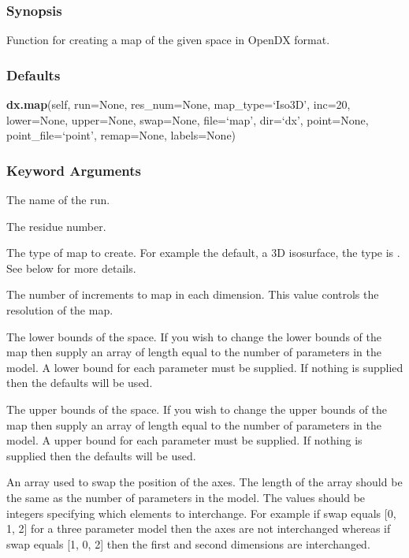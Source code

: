 \subsubsection{Synopsis}

Function for creating a map of the given space in OpenDX format.

\subsubsection{Defaults}

\textsf{\textbf{dx.map}(self, run=None, res\_num=None, map\_type=`Iso3D', inc=20, lower=None, upper=None, swap=None, file=`map', dir=`dx', point=None, point\_file=`point', remap=None, labels=None)}


\subsubsection{Keyword Arguments}


  The name of the run.

  The residue number.

  The type of map to create.  For example the default, a 3D isosurface, the type is 
.  See below for more details.

  The number of increments to map in each dimension.  This value controls the resolution of the map.

  The lower bounds of the space.  If you wish to change the lower bounds of the map then supply an array of length equal to the number of parameters in the model.  A lower bound for each parameter must be supplied.  If nothing is supplied then the defaults will be used.

  The upper bounds of the space.  If you wish to change the upper bounds of the map then supply an array of length equal to the number of parameters in the model.  A upper bound for each parameter must be supplied.  If nothing is supplied then the defaults will be used.

  An array used to swap the position of the axes.  The length of the array should be the same as the number of parameters in the model.  The values should be integers specifying which elements to interchange.  For example if swap equals [0, 1, 2] for a three parameter model then the axes are not interchanged whereas if swap equals [1, 0, 2] then the first and second dimensions are interchanged.

